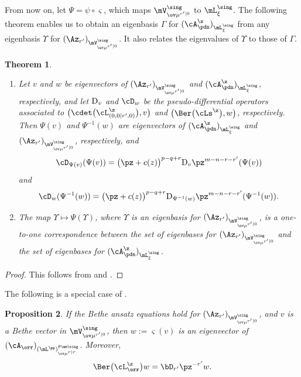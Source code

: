 \documentclass[11pt, reqno]{amsart}
\newtheorem{thm}{Theorem}[section]
\newtheorem{prop}[thm]{Proposition}
\theoremstyle{definition}
\theoremstyle{remark}
\numberwithin{equation}{section}
\begin{document}
From now on, let $\Psi=\psi \circ \varsigma$, which maps $\mV^\sing_{\ov\mu^{r'|0}}$ to $\mL^\sing_{\xi}$.
The following theorem enables us to obtain an eigenbasis $\Gamma$ for $(\cA_\pdn^\z)_{\mL^\sing_{\xi}}$ from any eigenbasis $\Upsilon$ for $(\Az_{r'})_{\mV^\sing_{\ov\mu^{r'|0}}}$.
It also relates the eigenvalues of $\Upsilon$ to those of $\Gamma$.

\begin{thm} \label{gl-gls-eigen}
\begin{enumerate}[\normalfont(i)]

\item Let $v$ and $w$ be eigenvectors of $(\Az_{r'})_{\mV^\sing_{\ov\mu^{r'|0}}}$ and $(\cA_\pdn^\z)_{\mL^\sing_{\xi}}$, respectively, and let ${\rm D}_v$ and $\cD_w$ be the pseudo-differential operators associated to $\big(\cdet \big(\cL^\z_{(0,0|r',0)} \big), v \big)$ and $\big(\Ber \big(\cLs^\z \big), w \big)$, respectively. 
Then $\Psi (v)$ and $\Psi^{-1}(w)$ are eigenvectors of $(\cA_\pdn^\z)_{\mL^\sing_{\xi}}$ and $(\Az_{r'})_{\mV^\sing_{\ov\mu^{r'|0}}}$, respectively, and
$$
\cD_{\Psi(v)} (\Psi(v))
 = \big(\pz+c(z) \big)^{p-q+r}  {\rm D}_v \pz^{m-n-r-r'} (\Psi(v))
 $$
 and
 $$
\cD_w (\Psi^{-1}(w))
 = \big(\pz+c(z) \big)^{p-q+r}  {\rm D}_{\Psi^{-1}(w)} \pz^{m-n-r-r'} (\Psi^{-1}(w)).
$$

\item The map $\Upsilon  \mapsto \Psi(\Upsilon)$, where $\Upsilon$ is an eigenbasis for $(\Az_{r'})_{\mV^\sing_{\ov\mu^{r'|0}}}$, is a one-to-one correspondence between the set of eigenbases for $(\Az_{r'})_{\mV^\sing_{\ov\mu^{r'|0}}}$ and the set of eigenbases for $(\cA_\pdn^\z)_{\mL^\sing_{\xi}}$.

\end{enumerate}
\end{thm}

\begin{proof}
This follows from  and \cite[Proposition 4.9]{ChL25}.
\end{proof}

The following is a special case of \cite[Theorem 5.1]{ChL25}.

\begin{prop} \label{Bethe-gl-eigen}
 If the Bethe ansatz equations hold for $(\Az_{r'})_{\mV^\sing_{\ov\mu^{r'|0}}}$, and $v$ is a Bethe vector in $\mV^\sing_{\ov\mu^{r'|0}}$, then $w:= \varsigma (v)$ is an eigenvector of $(\cA_\orr)_{(\mL^\pp)^{\theta\mm\sing}_{\ov\mu^{r|r}}}$.
Moreover,
$$
\Ber \big(\cL^\z_\orr \big)w
=  \bD_{r'}  \pz^{-r'}w .
$$
\end{prop}
\end{document}
